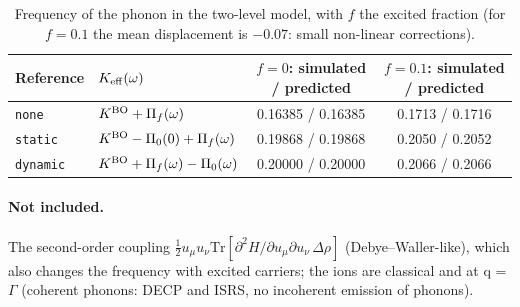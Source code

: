 \documentclass[11pt]{article}
\newcommand{\Dr}{\Delta\rho}
\begin{document}
\begin{table}[h]
\centering\small
\begin{tabular}{l l c c}
\toprule
Reference & $K_{\rm eff}(\omega)$ & $f=0$: simulated / predicted & $f=0.1$: simulated / predicted \\
\midrule
\texttt{none} & $K^{\rm BO}+\Pi_f(\omega)$ & 0.16385 / 0.16385 & 0.1713 / 0.1716 \\
\texttt{static} & $K^{\rm BO}-\Pi_0(0)+\Pi_f(\omega)$ & 0.19868 / 0.19868 & 0.2050 / 0.2052 \\
\texttt{dynamic} & $K^{\rm BO}+\Pi_f(\omega)-\Pi_0(\omega)$ & 0.20000 / 0.20000 & 0.2066 / 0.2066 \\
\bottomrule
\end{tabular}
\caption{Frequency of the phonon in the two-level model, with $f$ the excited fraction (for $f=0.1$ the mean
displacement is $-0.07$: small non-linear corrections).}
\label{tab:toy}
\end{table}

\paragraph{Not included.} The second-order coupling $\frac12u_\mu u_\nu\mathrm{Tr}[\partial^2H/\partial u_\mu\partial
u_\nu\,\Dr]$ (Debye--Waller-like), which also changes the frequency with excited carriers; the ions are classical and
at q = $\Gamma$ (coherent phonons: DECP and ISRS, no incoherent emission of phonons).
\end{document}

